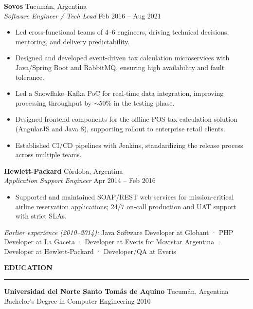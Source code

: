 \documentclass[11pt]{article}
\newcommand{\jobsep}{\vspace{8pt}}
\begin{document}
\jobsep


\textbf{Sovos} \hfill Tucumán, Argentina\\
\textit{Software Engineer / Tech Lead} \hfill Feb 2016 -- Aug 2021

\begin{itemize}
    \item Led cross-functional teams of 4--6 engineers, driving technical decisions, mentoring, and delivery predictability.
    \item Designed and developed event-driven tax calculation microservices with Java/Spring Boot and RabbitMQ, ensuring high availability and fault tolerance.
    \item Led a Snowflake--Kafka PoC for real-time data integration, improving processing throughput by $\sim$50\% in the testing phase.
    \item Designed frontend components for the offline POS tax calculation solution (AngularJS and Java 8), supporting rollout to enterprise retail clients.
    \item Established CI/CD pipelines with Jenkins, standardizing the release process across multiple teams.
\end{itemize}

\jobsep

\textbf{Hewlett-Packard} \hfill Córdoba, Argentina\\
\textit{Application Support Engineer} \hfill Apr 2014 -- Feb 2016

\begin{itemize}
    \item Supported and maintained SOAP/REST web services for mission-critical airline reservation applications; 24/7 on-call production and UAT support with strict SLAs.
\end{itemize}

\jobsep

\textit{Earlier experience (2010--2014):} Java Software Developer at Globant · PHP Developer at La Gaceta · Developer at Everis for Movistar Argentina · Developer at Hewlett-Packard · Developer/QA at Everis

\vspace{20pt}

{\large \textbf{EDUCATION}}\\[3pt]
\hrule
\vspace{3pt}

\textbf{Universidad del Norte Santo Tomás de Aquino} \hfill Tucumán, Argentina\\
Bachelor's Degree in Computer Engineering \hfill 2010
\end{document}
